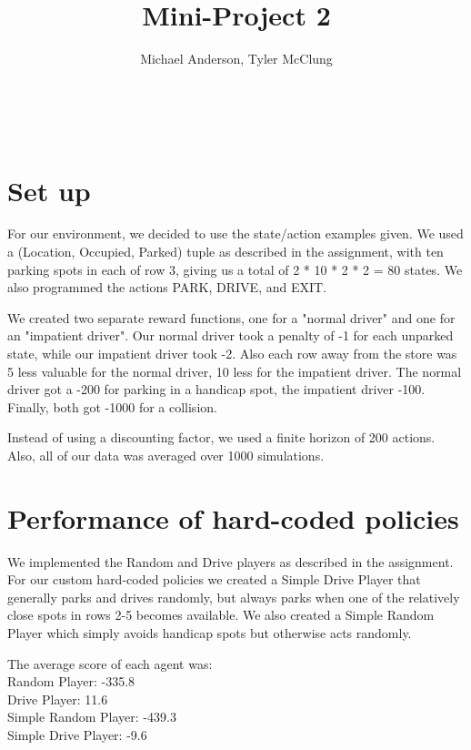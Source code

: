 \documentclass{article}
\author{Michael Anderson, Tyler McClung}
\title{Mini-Project 2}
\begin{document}
\maketitle
{}
\\
\flushleft
\newpage

\section{Set up}

For our environment, we decided to use the state/action examples given. We used a (Location, Occupied, Parked) tuple as described in the assignment, with ten
parking spots in each of row 3, giving us a total of 2 * 10 * 2 * 2 = 80 states.
We also programmed the actions PARK, DRIVE, and EXIT.

\vspace{1em}

We created two separate reward functions, one for a "normal driver" and one for
an "impatient driver". Our normal driver took a penalty of -1 for each unparked state, while our impatient driver took -2. Also each row away from the store 
was 5 less valuable for the normal driver, 10 less for the impatient driver.
The normal driver got a -200 for parking in a handicap spot, the impatient
driver -100. Finally, both got -1000 for a collision.

\vspace{1em}

Instead of using a discounting factor, we used a finite horizon of 200 actions.
Also, all of our data was averaged over 1000 simulations.


\section{Performance of hard-coded policies}

We implemented the Random and Drive players as described in the assignment.
For our custom hard-coded policies we created a Simple Drive Player that 
generally parks and drives randomly, but always parks when one of the relatively
close spots in rows 2-5 becomes
available. We also created a Simple Random Player which simply avoids handicap
spots but otherwise acts randomly.

\vspace{1em}

The average score of each agent was:\\
Random Player: -335.8\\
Drive Player: 11.6\\
Simple Random Player: -439.3\\
Simple Drive Player: -9.6\\
\end{document}
